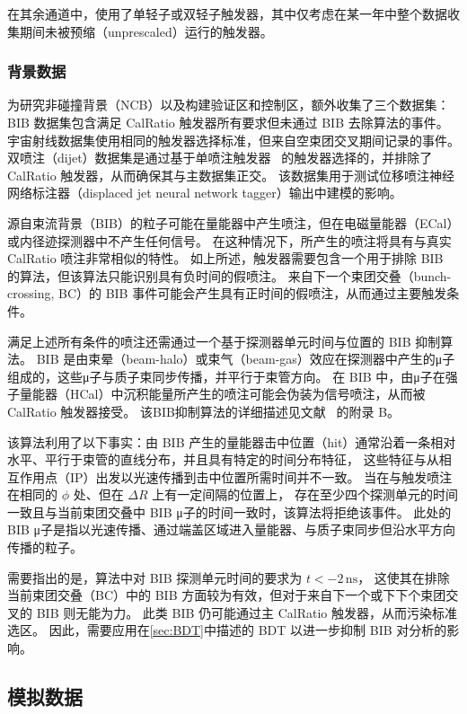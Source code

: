 在其余通道中，使用了单轻子或双轻子触发器，其中仅考虑在某一年中整个数据收集期间未被预缩（unprescaled）运行的触发器。


\subsubsection{背景数据}
为研究非碰撞背景（NCB）以及构建验证区和控制区，额外收集了三个数据集：
BIB 数据集包含满足 CalRatio 触发器所有要求但未通过 BIB 去除算法的事件。
宇宙射线数据集使用相同的触发器选择标准，但来自空束团交叉期间记录的事件。
双喷注（dijet）数据集是通过基于单喷注触发器~\cite{trigger} 的触发器选择的，并排除了 CalRatio 触发器，从而确保其与主数据集正交。
该数据集用于测试位移喷注神经网络标注器（displaced jet neural network tagger）输出中建模的影响。

源自束流背景（BIB）的粒子可能在量能器中产生喷注，但在电磁量能器（ECal）或内径迹探测器中不产生任何信号。
在这种情况下，所产生的喷注将具有与真实 CalRatio 喷注非常相似的特性。
如上所述，触发器需要包含一个用于排除 BIB 的算法，但该算法只能识别具有负时间的假喷注。
来自下一个束团交叠（bunch-crossing, BC）的 BIB 事件可能会产生具有正时间的假喷注，从而通过主要触发条件。

满足上述所有条件的喷注还需通过一个基于探测器单元时间与位置的 BIB 抑制算法。
BIB 是由束晕（beam-halo）或束气（beam-gas）效应在探测器中产生的μ子组成的，这些μ子与质子束同步传播，并平行于束管方向。
在 BIB 中，由μ子在强子量能器（HCal）中沉积能量所产生的喷注可能会伪装为信号喷注，从而被 CalRatio 触发器接受。
该BIB抑制算法的详细描述见文献~\cite{ATLAS-CONF-2016-103} 的附录 B。

该算法利用了以下事实：由 BIB 产生的量能器击中位置（hit）通常沿着一条相对水平、平行于束管的直线分布，并且具有特定的时间分布特征，
这些特征与从相互作用点（IP）出发以光速传播到击中位置所需时间并不一致。
当在与触发喷注在相同的 $\phi$ 处、但在 $\Delta R$ 上有一定间隔的位置上，
存在至少四个探测单元的时间一致且与当前束团交叠中 BIB μ子的时间一致时，该算法将拒绝该事件。
此处的 BIB μ子是指以光速传播、通过端盖区域进入量能器、与质子束同步但沿水平方向传播的粒子。

需要指出的是，算法中对 BIB 探测单元时间的要求为 $t < -2\,\mathrm{ns}$，
这使其在排除当前束团交叠（BC）中的 BIB 方面较为有效，但对于来自下一个或下下个束团交叉的 BIB 则无能为力。
此类 BIB 仍可能通过主 CalRatio 触发器，从而污染标准选区。
因此，需要应用在\autoref{sec:BDT}中描述的 BDT 以进一步抑制 BIB 对分析的影响。


\subsection{模拟数据}
